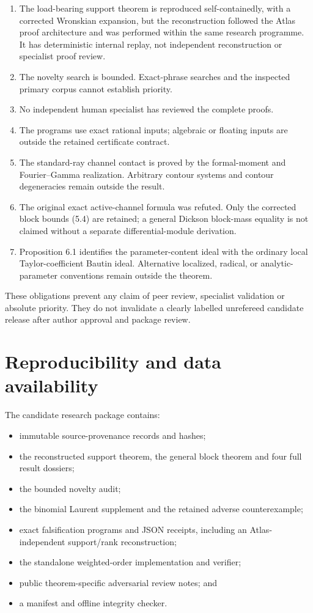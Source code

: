 \documentclass[
  11pt,
  a4paper,
]{amsart}
\providecommand{\tightlist}{%
  \setlength{\itemsep}{0pt}\setlength{\parskip}{0pt}}
\begin{document}
\begin{enumerate}
\def\labelenumi{\arabic{enumi}.}
\tightlist
\item
  The load-bearing support theorem is reproduced self-containedly, with
  a corrected Wronskian expansion, but the reconstruction followed the
  Atlas proof architecture and was performed within the same research
  programme. It has deterministic internal replay, not independent
  reconstruction or specialist proof review.
\item
  The novelty search is bounded. Exact-phrase searches and the inspected
  primary corpus cannot establish priority.
\item
  No independent human specialist has reviewed the complete proofs.
\item
  The programs use exact rational inputs; algebraic or floating inputs
  are outside the retained certificate contract.
\item
  The standard-ray channel contact is proved by the formal-moment and
  Fourier--Gamma realization. Arbitrary contour systems and contour
  degeneracies remain outside the result.
\item
  The original exact active-channel formula was refuted. Only the
  corrected block bounds (5.4) are retained; a general Dickson
  block-mass equality is not claimed without a separate
  differential-module derivation.
\item
  Proposition 6.1 identifies the parameter-content ideal with the
  ordinary local Taylor-coefficient Bautin ideal. Alternative localized,
  radical, or analytic-parameter conventions remain outside the theorem.
\end{enumerate}

These obligations prevent any claim of peer review, specialist
validation or absolute priority. They do not invalidate a clearly
labelled unrefereed candidate release after author approval and package
review.

\section{Reproducibility and data availability}

The candidate research package contains:

\begin{itemize}
\tightlist
\item
  immutable source-provenance records and hashes;
\item
  the reconstructed support theorem, the general block theorem and four
  full result dossiers;
\item
  the bounded novelty audit;
\item
  the binomial Laurent supplement and the retained adverse
  counterexample;
\item
  exact falsification programs and JSON receipts, including an
  Atlas-independent support/rank reconstruction;
\item
  the standalone weighted-order implementation and verifier;
\item
  public theorem-specific adversarial review notes; and
\item
  a manifest and offline integrity checker.
\end{itemize}
\end{document}
